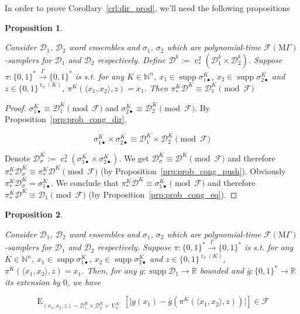\documentclass{article}
\numberwithin{equation}{section}
\theoremstyle{definition}
\theoremstyle{plain}
\newtheorem{proposition}{Proposition}[section]
\newcommand{\Bool}{\{0,1\}}
\newcommand{\Words}{{\Bool^*}}
\DeclareMathOperator{\Supp}{supp}
\DeclareMathOperator{\E}{E}
\DeclareMathOperator{\R}{r}
\DeclareMathOperator{\Un}{U}
\DeclareMathOperator{\En}{c}
\newcommand{\Nats}{\mathbb{N}}
\newcommand{\Reals}{\mathbb{R}}
\newcommand{\Abs}[1]{\lvert #1 \rvert}
\newcommand{\Chev}[1]{\langle #1 \rangle}
\newcommand{\Dist}{\mathcal{D}}
\newcommand{\MGrow}{\mathrm{M}\Gamma}
\newcommand{\Fall}{\mathcal{F}}
\newcommand{\EMG}{\Fall(\MGrow)}
\newcommand{\Scheme}{\xrightarrow{\Gamma}}
\begin{document}
In order to prove Corollary~\ref{crl:dir_prod}, we'll need the following propositions

\begin{samepage}
\begin{proposition}
\label{prp:thm__mult__cond1}

Consider $\Dist_1$, $\Dist_2$ word ensembles and $\sigma_1$, $\sigma_2$ which are polynomial-time $\EMG$-samplers for $\Dist_1$ and $\Dist_2$ respectively. Define ${\Dist^k:=\En_*^2(\Dist_1^k \times \Dist_2^k)}$. Suppose $\pi: \Words \Scheme \Words$ is s.t. for any $K \in \Nats^n$, $x_1 \in \Supp \sigma_{1\bullet}^{K}$, ${x_2 \in \Supp \sigma_{2\bullet}^{K}}$ and $z \in \Bool^{\R_\pi(K)}$, $\pi^{K}(\Chev{x_1,x_2},z)=x_1$. Then $\pi_*^K\Dist^{K} \equiv \Dist_1^{K} \pmod \Fall$

\end{proposition}
\end{samepage}

\begin{proof}

$\sigma_{1\bullet}^{K} \equiv \Dist_1^{K} \pmod \Fall$ and $\sigma_{2\bullet}^{K} \equiv \Dist_2^{K} \pmod \Fall$.  By Proposition~\ref{prp:prob_cong_dir},

\[\sigma_{1\bullet}^{K} \times \sigma_{2\bullet}^{K} \equiv \Dist_1^{K} \times \Dist_2^{K} \pmod \Fall\]

Denote $\Dist_\sigma^{K}:=\En_*^2(\sigma_{1\bullet}^{K} \times \sigma_{2\bullet}^{K})$. We get ${\Dist_\sigma^{K} \equiv \Dist^{K} \pmod \Fall}$ and therefore ${\pi_*^K\Dist_\sigma^{K} \equiv \pi_*^K\Dist^{K} \pmod \Fall}$ (by Proposition~\ref{prp:prob_cong_push}). Obviously $\pi_*^K\Dist_\sigma^{K}=\sigma_{1\bullet}^{K}$. We conclude that ${\pi_*^K\Dist^{K} \equiv \sigma_{1\bullet}^{K} \pmod \Fall}$ and therefore ${\pi_*^K\Dist^{K} \equiv \Dist_1 \pmod \Fall}$ (by Proposition~\ref{prp:prob_cong_eq}).
\end{proof}

\begin{samepage}
\begin{proposition}
\label{prp:thm__mult__cond2}

Consider $\Dist_1$, $\Dist_2$ word ensembles and $\sigma_1$, $\sigma_2$ which are polynomial-time $\EMG$-samplers for $\Dist_1$ and $\Dist_2$ respectively. Suppose $\pi: \Words \Scheme \Words$ is s.t. for any $K \in \Nats^n$, $x_1 \in \Supp \sigma_{1\bullet}^{K}$, ${x_2 \in \Supp \sigma_{2\bullet}^{K}}$ and $z \in \Bool^{\R_\pi(K)}$, $\pi^{K}(\Chev{x_1,x_2},z)=x_1$. Then, for any $g: \Supp \Dist_1 \rightarrow \Reals$ bounded and ${\bar{g}: \Words \rightarrow \Reals}$ its extension by ${0}$, we have 

$$\E_{(x_1,x_2,z) \sim\Dist_1^{K} \times \Dist_2^{K} \times \Un_\pi^{K}}[\Abs{g(x_1)-\bar{g}(\pi^{K}(\Chev{x_1,x_2},z))}] \in \Fall$$

\end{proposition}
\end{samepage}
\end{document}
